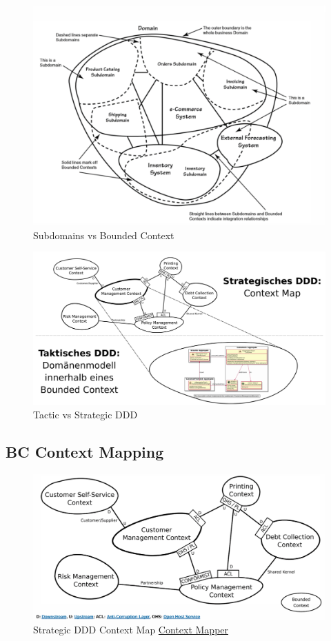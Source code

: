 \documentclass[../Main.tex]{subfiles}
\begin{document}
\begin{figure}[H]
    \centering
    \includegraphics[width=1\linewidth]{Images/subdomains-bounded-context.png}
    \caption{Subdomains vs Bounded Context}
\end{figure}



\begin{figure}[H]
    \centering
    \includegraphics[width=0.75\linewidth]{Images/tactic-strategic.png}
    \caption{Tactic vs Strategic DDD}
\end{figure}

\subsection{BC Context Mapping}
\begin{figure}[H]
    \centering
    \includegraphics[width=0.75\linewidth]{Images/bc-context-map.png}
    \caption{Strategic DDD Context Map \href{https://contextmapper.org/docs/examples/}{Context Mapper}}
\end{figure}
\end{document}
